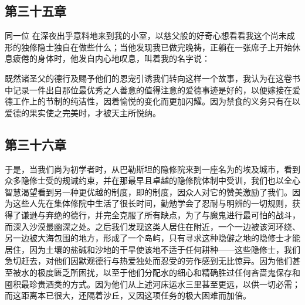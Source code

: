 
\subsection{第三十五章}

\par

同一位 在深夜出乎意料地来到我的小室，以慈父般的好奇心想看看我这个尚未成形的独修隐士独自在做些什么；当他发现我已做完晚祷，正躺在一张席子上开始休息疲倦的身体时，他发自内心地叹息，叫着我的名字说：\par

既然诸圣父的德行及赐予他们的恩宠引诱我们转向这样一个故事，我认为在这卷书中记录一件出自那位最优秀之人善意的值得注意的爱德事迹是好的，以便嫁接在爱德工作上的节制的纯洁性，因着愉悦的变化而更加闪耀。因为禁食的义务只有在以爱德的果实使之完美时，才被天主所悦纳。\par


\subsection{第三十六章}

\par

于是，当我们尚为初学者时，从巴勒斯坦的隐修院来到一座名为的埃及城市，看到众多隐修士受的规诫约束，并在那最早且卓越的隐修院体制中受训，我们也以全心智慧渴望看到另一种更优越的制度，即的制度，因众人对它的赞美激励了我们。因为这些人先在集体修院中生活了很长时间，勤勉学会了忍耐与明辨的一切规则，获得了谦逊与弃绝的德行，并完全克服了所有缺点，为了与魔鬼进行最可怕的战斗，而深入沙漠最幽深之处。之后我们发现这类人居住在附近，一个一边被该河环绕、另一边被大海包围的地方，形成了一个岛屿，只有寻求这种隐僻之地的隐修士才能居住，因为土壤的盐碱和沙地的干旱使该地不适于任何耕种——这些隐修士，我们急切赶去，对他们因默观德行与热爱独处而忍受的劳作感到无比惊异。因为他们甚至被水的极度匮乏所困扰，以至于他们分配水的细心和精确胜过任何吝啬鬼保存和囤积最珍贵酒类的方式。因为他们从上述河床运水三里甚至更远，以供一切必需；而这距离本已很大，还隔着沙丘，又因这项任务的极大困难而加倍。\par

